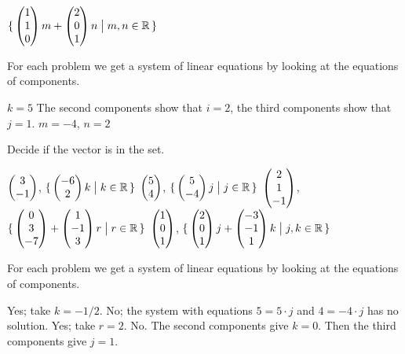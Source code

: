 \begin{exercises}
\begin{exparts}
        $\mbox{$\{\,\begin{pmatrix} 1 \\ 1 \\ 0 \end{pmatrix}m
               +\begin{pmatrix} 2 \\ 0 \\ 1 \end{pmatrix}n\bigm| m,n\in\mathbb{R}\,\}$}$
    \end{exparts}
    \begin{answer}
      For each problem we get a system of linear equations by looking at the 
      equations of components.
      \begin{exparts}
       \partsitem $k=5$
       \partsitem The second components show that $i=2$, the third
       components show that $j=1$.
       \partsitem $m=-4$, $n=2$
      \end{exparts} 
    \end{answer}
  \item 
    Decide if the vector is in the set.
    \begin{exparts}
      \partsitem $\begin{pmatrix} 3 \\ -1 \end{pmatrix}$,
        $\mbox{$\{\,\begin{pmatrix} -6 \\ 2 \end{pmatrix}k\bigm| k\in\mathbb{R}\,\}$}$
      \partsitem $\begin{pmatrix} 5 \\ 4 \end{pmatrix}$,
        $\mbox{$\{\,\begin{pmatrix} 5 \\ -4 \end{pmatrix}j\bigm| j\in\mathbb{R}\,\}$}$
      \partsitem $\begin{pmatrix} 2 \\ 1 \\ -1 \end{pmatrix}$,
        $\mbox{$\{\,\begin{pmatrix} 0 \\ 3 \\ -7 \end{pmatrix}+\begin{pmatrix} 1 \\ -1 \\ 3 \end{pmatrix}r\bigm| r\in\mathbb{R}\,\}$}$
      \partsitem $\begin{pmatrix} 1 \\ 0 \\ 1 \end{pmatrix}$,
        $\mbox{$\{\,\begin{pmatrix} 2 \\ 0 \\ 1 \end{pmatrix}j
            +\begin{pmatrix} -3 \\ -1 \\ 1 \end{pmatrix}k\bigm| j,k\in\mathbb{R}\,\}$}$
    \end{exparts}
    \begin{answer}
      For each problem we get a system of linear equations by looking at the 
      equations of components.
      \begin{exparts}
        \partsitem Yes; take $k=-1/2$.
        \partsitem No; the system with equations $5=5\cdot j$ and
            $4=-4\cdot j$ has no solution.
        \partsitem Yes; take $r=2$.
        \partsitem No.
           The second components give $k=0$.
           Then the third components give $j=1$.

\end{exparts}
\end{answer}
\end{exercises}
